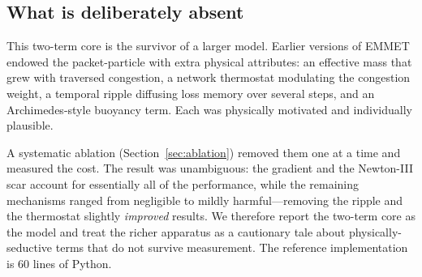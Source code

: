 \subsection{What is deliberately absent}
\label{sec:absent}

This two-term core is the survivor of a larger model. Earlier versions of
EMMET endowed the packet-particle with extra physical attributes: an
effective mass that grew with traversed congestion, a network thermostat
modulating the congestion weight, a temporal ripple diffusing loss memory
over several steps, and an Archimedes-style buoyancy term. Each was
physically motivated and individually plausible.

A systematic ablation (Section~\ref{sec:ablation}) removed them one at a time
and measured the cost. The result was unambiguous: the gradient and the
Newton-III scar account for essentially all of the performance, while the
remaining mechanisms ranged from negligible to mildly harmful---removing the
ripple and the thermostat slightly \emph{improved} results. We therefore
report the two-term core as the model and treat the richer apparatus as a
cautionary tale about physically-seductive terms that do not survive
measurement. The reference implementation is 60 lines of Python.


